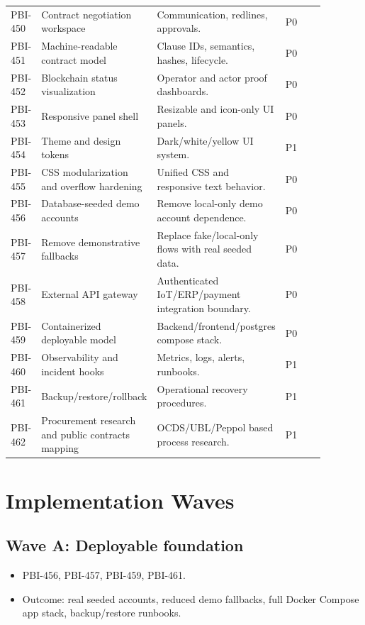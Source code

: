 \documentclass[11pt]{article}
\begin{document}
\begin{longtable}{p{0.09\linewidth}p{0.25\linewidth}p{0.38\linewidth}p{0.16\linewidth}}
PBI-450 & Contract negotiation workspace & Communication, redlines, approvals. & P0 \\
PBI-451 & Machine-readable contract model & Clause IDs, semantics, hashes, lifecycle. & P0 \\
PBI-452 & Blockchain status visualization & Operator and actor proof dashboards. & P0 \\
PBI-453 & Responsive panel shell & Resizable and icon-only UI panels. & P0 \\
PBI-454 & Theme and design tokens & Dark/white/yellow UI system. & P1 \\
PBI-455 & CSS modularization and overflow hardening & Unified CSS and responsive text behavior. & P0 \\
PBI-456 & Database-seeded demo accounts & Remove local-only demo account dependence. & P0 \\
PBI-457 & Remove demonstrative fallbacks & Replace fake/local-only flows with real seeded data. & P0 \\
PBI-458 & External API gateway & Authenticated IoT/ERP/payment integration boundary. & P0 \\
PBI-459 & Containerized deployable model & Backend/frontend/postgres compose stack. & P0 \\
PBI-460 & Observability and incident hooks & Metrics, logs, alerts, runbooks. & P1 \\
PBI-461 & Backup/restore/rollback & Operational recovery procedures. & P1 \\
PBI-462 & Procurement research and public contracts mapping & OCDS/UBL/Peppol based process research. & P1 \\
\bottomrule
\end{longtable}

\section{Implementation Waves}

\subsection{Wave A: Deployable foundation}
\begin{itemize}
  \item PBI-456, PBI-457, PBI-459, PBI-461.
  \item Outcome: real seeded accounts, reduced demo fallbacks, full Docker Compose app stack, backup/restore runbooks.
\end{itemize}
\end{document}
